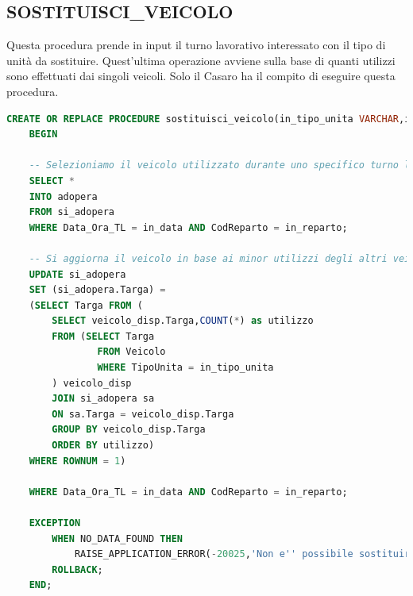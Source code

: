 \documentclass[12pt]{report}
\begin{document}
\subsection*{SOSTITUISCI\_VEICOLO}
Questa procedura prende in input il turno lavorativo interessato con il tipo di unità da sostituire. Quest'ultima operazione avviene sulla base di quanti utilizzi sono effettuati dai singoli veicoli. Solo il Casaro ha il compito di eseguire questa procedura. 
\begin{lstlisting}[language=SQL,caption={SOSTITUISCI\_VEICOLO}]
    CREATE OR REPLACE PROCEDURE sostituisci_veicolo(in_tipo_unita VARCHAR,in_reparto CHAR,in_data DATE) IS adopera si_adopera%ROWTYPE;
    BEGIN
    
    -- Selezioniamo il veicolo utilizzato durante uno specifico turno lavorativo
    SELECT *
    INTO adopera
    FROM si_adopera
    WHERE Data_Ora_TL = in_data AND CodReparto = in_reparto;
    
    -- Si aggiorna il veicolo in base ai minor utilizzi degli altri veicoli disponibili
    UPDATE si_adopera
    SET (si_adopera.Targa) = 
    (SELECT Targa FROM (
        SELECT veicolo_disp.Targa,COUNT(*) as utilizzo
	    FROM (SELECT Targa
	            FROM Veicolo
	            WHERE TipoUnita = in_tipo_unita
	    ) veicolo_disp
	    JOIN si_adopera sa
	    ON sa.Targa = veicolo_disp.Targa 
	    GROUP BY veicolo_disp.Targa
	    ORDER BY utilizzo)
    WHERE ROWNUM = 1)
    
    WHERE Data_Ora_TL = in_data AND CodReparto = in_reparto;
    
    EXCEPTION
        WHEN NO_DATA_FOUND THEN
            RAISE_APPLICATION_ERROR(-20025,'Non e'' possibile sostituire il veicolo.');
        ROLLBACK;
    END;
\end{lstlisting}
\end{document}
